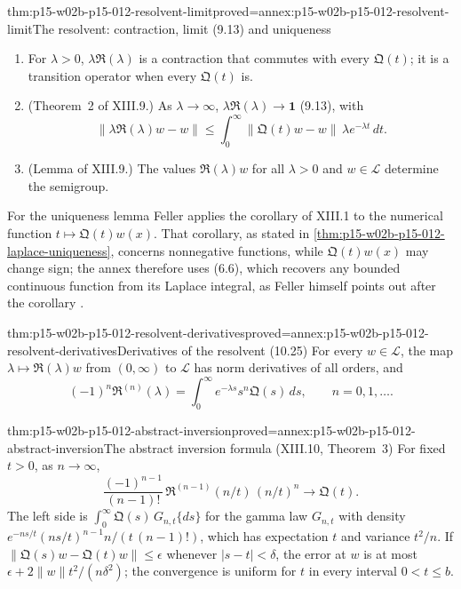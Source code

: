 \begin{hbtheorem}{thm:p15-w02b-p15-012-resolvent-limit}{proved=annex:p15-w02b-p15-012-resolvent-limit}{The resolvent: contraction, limit (9.13) and uniqueness}
\begin{enumerate}
\item For \(\lambda>0\), \(\lambda\mathfrak R(\lambda)\) is a contraction that
      commutes with every \(\mathfrak Q(t)\); it is a transition operator when
      every \(\mathfrak Q(t)\) is.
\item (Theorem~2 of XIII.9.) As \(\lambda\to\infty\),
      \(\lambda\mathfrak R(\lambda)\to\mathbf 1\) (9.13), with
      \[
       \|\lambda\mathfrak R(\lambda)w-w\|\leq
         \int_0^\infty\|\mathfrak Q(t)w-w\|\,\lambda e^{-\lambda t}\,dt .
       \tag{9.14}
      \]
\item (Lemma of XIII.9.) The values \(\mathfrak R(\lambda)w\) for all
      \(\lambda>0\) and \(w\in\mathscr L\) determine the semigroup.
\end{enumerate}
\end{hbtheorem}

For the uniqueness lemma Feller applies the corollary of XIII.1 to the
numerical function \(t\mapsto\mathfrak Q(t)w(x)\). That corollary, as stated in
\cref{thm:p15-w02b-p15-012-laplace-uniqueness}, concerns nonnegative functions,
while \(\mathfrak Q(t)w(x)\) may change sign; the annex therefore uses (6.6),
which recovers any bounded continuous function from its Laplace integral, as
Feller himself points out after the corollary
\cite[vol.~II, XIII.1, p.~433]{Feller1971ProbabilityII}.

\begin{hbtheorem}{thm:p15-w02b-p15-012-resolvent-derivatives}{proved=annex:p15-w02b-p15-012-resolvent-derivatives}{Derivatives of the resolvent (10.25)}
For every \(w\in\mathscr L\), the map \(\lambda\mapsto\mathfrak R(\lambda)w\)
from \((0,\infty)\) to \(\mathscr L\) has norm derivatives of all orders, and
\[
 (-1)^n\mathfrak R^{(n)}(\lambda)=\int_0^\infty e^{-\lambda s}s^n\mathfrak Q(s)\,ds,
 \qquad n=0,1,\ldots .
 \tag{10.25}
\]
\end{hbtheorem}

\begin{hbtheorem}{thm:p15-w02b-p15-012-abstract-inversion}{proved=annex:p15-w02b-p15-012-abstract-inversion}{The abstract inversion formula (XIII.10, Theorem~3)}
For fixed \(t>0\), as \(n\to\infty\),
\[
 \frac{(-1)^{n-1}}{(n-1)!}\,\mathfrak R^{(n-1)}(n/t)\,(n/t)^n\longrightarrow\mathfrak Q(t).
 \tag{10.24}
\]
The left side is \(\int_0^\infty\mathfrak Q(s)\,G_{n,t}\{ds\}\) for the gamma
law \(G_{n,t}\) with density
\(e^{-ns/t}(ns/t)^{n-1}n/(t\,(n-1)!)\), which has expectation \(t\) and
variance \(t^2/n\). If \(\|\mathfrak Q(s)w-\mathfrak Q(t)w\|\leq\epsilon\)
whenever \(|s-t|<\delta\), the error at \(w\) is at most
\(\epsilon+2\|w\|t^2/(n\delta^2)\); the convergence is uniform for \(t\) in
every interval \(0<t\leq b\).
\end{hbtheorem}

